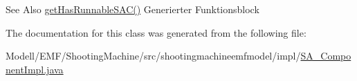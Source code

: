 \begin{DoxySeeAlso}{See Also}
\hyperlink{classshootingmachineemfmodel_1_1impl_1_1_s_a___component_impl_a4e201e8a6ffc5a7434539c6b2d36e1e4}{get\-Has\-Runnable\-S\-A\-C()} Generierter Funktionsblock  
\end{DoxySeeAlso}


The documentation for this class was generated from the following file\-:\begin{DoxyCompactItemize}
\item 
Modell/\-E\-M\-F/\-Shooting\-Machine/src/shootingmachineemfmodel/impl/\hyperlink{_s_a___component_impl_8java}{S\-A\-\_\-\-Component\-Impl.\-java}\end{DoxyCompactItemize}

